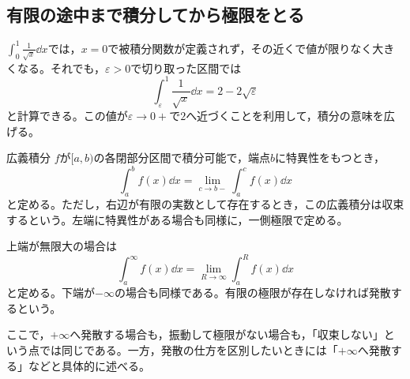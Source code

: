 \subsection{有限の途中まで積分してから極限をとる}

$\int_0^1\frac1{\sqrt{x}}\dd x$では，$x=0$で被積分関数が定義されず，その近くで値が限りなく大きくなる。それでも，$\varepsilon>0$で切り取った区間では
\[
 \int_{\varepsilon}^1\frac1{\sqrt{x}}\dd x
 =2-2\sqrt{\varepsilon}
\]
と計算できる。この値が$\varepsilon\to0+$で$2$へ近づくことを利用して，積分の意味を広げる。

\begin{definition}{広義積分}
$f$が$[a,b)$の各閉部分区間で積分可能で，端点$b$に特異性をもつとき，
\[
 \int_a^bf(x)\dd x=\lim_{c\to b-}\int_a^cf(x)\dd x
\]
と定める。ただし，右辺が有限の実数として存在するとき，この広義積分は収束するという。左端に特異性がある場合も同様に，一側極限で定める。

上端が無限大の場合は
\[
 \int_a^{\infty}f(x)\dd x=\lim_{R\to\infty}\int_a^Rf(x)\dd x
\]
と定める。下端が$-\infty$の場合も同様である。有限の極限が存在しなければ発散するという。
\end{definition}

ここで，$+\infty$へ発散する場合も，振動して極限がない場合も，「収束しない」という点では同じである。一方，発散の仕方を区別したいときには「$+\infty$へ発散する」などと具体的に述べる。

